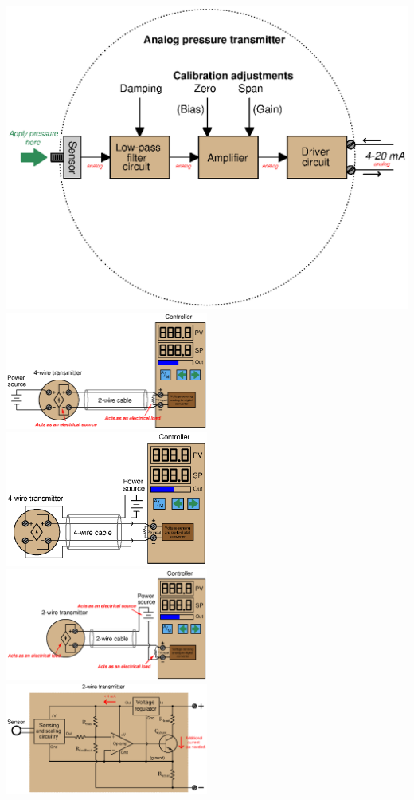 \includegraphics[width=1\textwidth]{calibrate04.eps}
\includegraphics[width=0.5\textwidth]{current09.eps}
\includegraphics[width=0.5\textwidth]{current10.eps}
\includegraphics[width=0.5\textwidth]{current11.eps}
\includegraphics[width=0.5\textwidth]{current12.eps}
